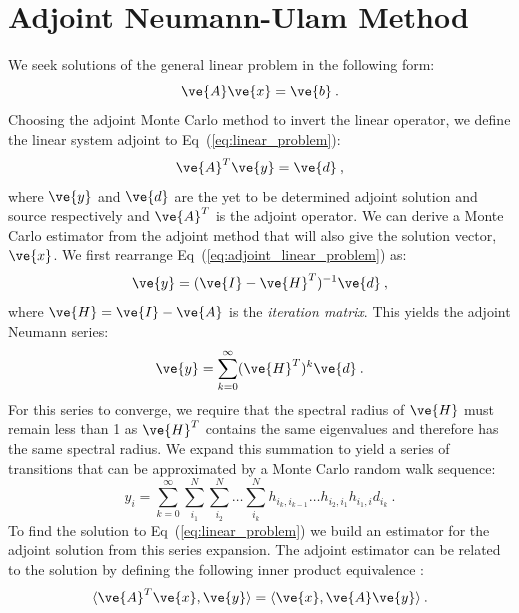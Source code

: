 \documentclass[preprint,11pt]{elsarticle}
\begin{document}
\section{Adjoint Neumann-Ulam Method}
\label{sec:adjoint_nu}

We seek solutions of the general linear problem in the following form:
\begin{equation}
  \ve{A} \ve{x} = \ve{b}\:.
  \label{eq:linear_problem}
\end{equation}
Choosing the adjoint Monte Carlo method to invert the linear operator, we
define the linear system adjoint to Eq~(\ref{eq:linear_problem}):
\begin{equation}
  \ve{A}^T \ve{y} = \ve{d}\:,
  \label{eq:adjoint_linear_problem}
\end{equation}
where $\ve{y}$ and $\ve{d}$ are the yet to be determined adjoint solution and
source respectively and $\ve{A}^T$ is the adjoint operator. We can derive a
Monte Carlo estimator from the adjoint method that will also give the solution
vector, $\ve{x}$. We first rearrange Eq~(\ref{eq:adjoint_linear_problem}) as:
\begin{equation}
  \ve{y} = (\ve{I} - \ve{H}^T)^{-1} \ve{d}\:,
  \label{eq:adjoint_split_system_2}
\end{equation}
where $\ve{H} = \ve{I} - \ve{A}$ is the \textit{iteration matrix}.
This yields the adjoint Neumann series:
\begin{equation}
  \ve{y} = \sum_{k=0}^{\infty} (\ve{H}^T)^k\ve{d}\:.
  \label{eq:adjoint_neumann_series}
\end{equation}
For this series to converge, we require that the spectral radius of
$\ve{H}$ must remain less than 1 as $\ve{H}^T$ contains the same
eigenvalues and therefore has the same spectral radius. We expand this
summation to yield a series of transitions that can be approximated by
a Monte Carlo random walk sequence:
\begin{equation}
  y_i = \sum_{k=0}^{\infty}\sum_{i_1}^{N}\sum_{i_2}^{N}\ldots
  \sum_{i_k}^{N}h_{i_k,i_{k-1}}\ldots h_{i_2,i_1} h_{i_1,i} d_{i_k}\:.
  \label{eq:adjoint_neumann_solution}
\end{equation}
To find the solution to Eq~(\ref{eq:linear_problem}) we build an
estimator for the adjoint solution from this series expansion. The
adjoint estimator can be related to the solution by defining the
following inner product equivalence \cite{spanier_monte_1969}:
\begin{equation}
  \langle \ve{A}^T \ve{x}, \ve{y} \rangle = \langle \ve{x}, \ve{A}
  \ve{y} \rangle\:.
  \label{eq:adjoint_operator_product}
\end{equation}
\end{document}
